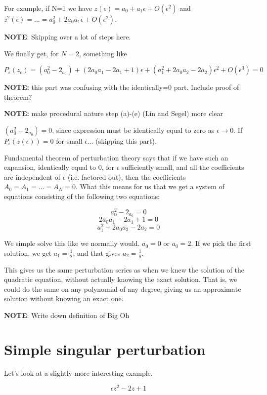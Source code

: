 \documentclass[12pt]{report}
\begin{document}
For example, if N=1 we have $z(\epsilon) = a_0 + a_1\epsilon +
O(\epsilon^2)$ and $z^2(\epsilon) = ... = a_0^2 + 2 a_0 a_1 \epsilon +
O(\epsilon^2)$.

\textbf{NOTE}: Skipping over a lot of steps here.

We finally get, for $N=2$, something like

$$P_\epsilon(z_\epsilon) = (a_0^2 - 2_{a_0}) + (2 a_0 a_1 - 2 a_1 +1)\epsilon + (a_1^2 + 2 a_0 a_2 -
2 a_2)\epsilon^2 + O(\epsilon^3) = 0$$

\textbf{NOTE:} this part was confusing with the identically=0 part. Include proof of theorem?

\textbf{NOTE:} make procedural nature step (a)-(e) (Lin and Segel) more clear

$(a_0^2 - 2_{a_0}) = 0$, since expression must be identically equal to zero as
$\epsilon \to 0$. If $P_\epsilon(z(\epsilon)) = 0$ for small $\epsilon$... (skipping this part).

Fundamental theorem of perturbation theory says that if we have such an
expansion, identically equal to 0, for $\epsilon$ sufficiently small, and all
the coefficients are independent of $\epsilon$ (i.e. factored out), then the
coefficients $A_0 = A_1 = ... = A_N = 0$. What this means for us that we get a
system of equations consisting of the following two equations:

$$ a_0^2 - 2_{a_0} = 0$$
$$ 2 a_0 a_1 - 2 a_1 +1 = 0 $$
$$ a_1^2 + 2 a_0 a_2 -2 a_2 = 0$$

We simple solve this like we normally would. $a_0 = 0$ or $a_0 = 2$. If
we pick the first solution, we get $a_1=\frac 1 2$, and that gives
$a_2 = \frac 1 8$.

This gives us the same perturbation series as when we knew the
solution of the quadratic equation, without actually knowing the exact
solution. That is, we could do the same on any polynomial of any
degree, giving us an approximate solution without knowing an exact
one.


\textbf{NOTE}: Write down definition of Big Oh

\section{Simple singular perturbation}

Let's look at a slightly more interesting example.

\begin{equation}
  \epsilon z^2 - 2z + 1
\end{equation}
\end{document}
